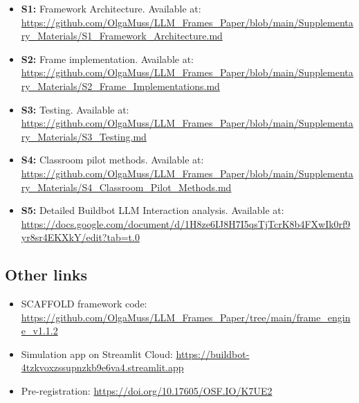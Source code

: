 \documentclass[fleqn,10pt]{wlscirep}
\begin{document}
\begin{itemize}
\item \textbf{S1:} Framework Architecture. Available at: \url{https://github.com/OlgaMuss/LLM_Frames_Paper/blob/main/Supplementary_Materials/S1_Framework_Architecture.md}
\item \textbf{S2:} Frame implementation. Available at: \url{https://github.com/OlgaMuss/LLM_Frames_Paper/blob/main/Supplementary_Materials/S2_Frame_Implementations.md}
\item \textbf{S3:} Testing. Available at: \url{https://github.com/OlgaMuss/LLM_Frames_Paper/blob/main/Supplementary_Materials/S3_Testing.md}
\item \textbf{S4:} Classroom pilot methods. Available at: \url{https://github.com/OlgaMuss/LLM_Frames_Paper/blob/main/Supplementary_Materials/S4_Classroom_Pilot_Methods.md}
\item \textbf{S5:} Detailed Buildbot LLM Interaction analysis. Available at: \url{https://docs.google.com/document/d/1H8ze6IJ8H7I5qsTjTcrK8b4FXwIk0rf9yr8sr4EKXkY/edit?tab=t.0}
\end{itemize}

\subsection*{Other links}

\begin{itemize}
\item SCAFFOLD framework code: \url{https://github.com/OlgaMuss/LLM_Frames_Paper/tree/main/frame_engine_v1.1.2}
\item Simulation app on Streamlit Cloud: \url{https://buildbot-4tzkvoxzssupnzkb9e6va4.streamlit.app}
\item Pre-registration: \url{https://doi.org/10.17605/OSF.IO/K7UE2}
\end{itemize}
\end{document}
